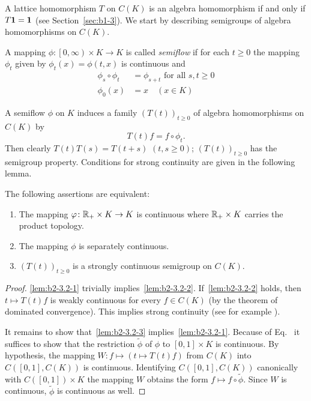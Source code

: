 A lattice homomorphism $T$ on $C(K)$ is an algebra homomorphism if and only if\/ $T \mathbf{1} = \mathbf{1}$ (see Section~\ref{sec:b1-3}).
We start by describing semigroups of algebra homomor\-phisms on $C(K)$.
\begin{definition}\label{def:b2-3.1}
A mapping $\phi \colon \left[0,\infty\right) \times K \to K$ is called \emph{semiflow} if for each $t \geq 0$ the mapping $\phi_{t}$ given by $\phi_{t}(x) = \phi(t,x)$ is continuous and
\begin{align}
\phi_{s} \circ \phi_{t} &= \phi_{s+t} \text{ for all } s,t \geq 0 \label{eq:b2-3.1} \\
\phi_{0}(x) &= x \quad (x \in K) \label{eq:b2-3.2}
\end{align}
\end{definition}
A semiflow $\phi$ on $K$ induces a family $(T(t))_{t \geq 0}$ of algebra homomorphisms on $C(K)$ by
\begin{equation}\label{eq:b2-3.3}
T(t)f = f \circ \phi_{t}.
\end{equation}
Then clearly $T(t)T(s) = T(t+s)$ $(t,s\geq 0)$; \ie  $(T(t))_{t \geq 0}$ has the
semigroup property.
Conditions for strong continuity are given in the following lemma.
\begin{lemma}\label{lem:b2-3.2}
The following assertions are equivalent:
\begin{enumerate}[\upshape (a)]
\item \label{lem:b2-3.2-1}
The mapping $\phi \colon \R_{+} \times K \to K$ is continuous where $\mathbb{R}_{+} \times K$ carries the product topology.
\item \label{lem:b2-3.2-2}
The mapping $\phi$ is separately continuous.
\item \label{lem:b2-3.2-3}
$(T(t))_{t \geq 0}$ is a strongly continuous semigroup on $C(K)$.
\end{enumerate}
\end{lemma}
\begin{proof}
\ref{lem:b2-3.2-1} trivially implies~\ref{lem:b2-3.2-2}.
If~\ref{lem:b2-3.2-2} holds, then $t \mapsto T(t)f$ is weakly continuous for every $f \in C(K)$ (by the theorem of dominated convergence).
This implies strong continuity (see for example \textcite[Proposition 1.23]{davies:1980}).

It remains to show that~\ref{lem:b2-3.2-3} implies~\ref{lem:b2-3.2-1}.
Because of Eq.~ it suffices to show that the restriction $\widetilde{\phi}$ of\/ $\phi$ to $[0,1] \times K$ is continuous.
By hypothesis, the mapping $W \colon f \mapsto (t \mapsto T(t)f)$ from $C(K)$ into $C([0,1],C(K))$ is continuous.
Identifying $C([0,1],C(K))$ canonically with $C([0,1]) \times K$ the mapping $W$ obtains the form $f \mapsto f \circ \widetilde{\phi}$.
Since $W$ is continuous, $\widetilde{\phi}$ is continuous as well.
\end{proof}

